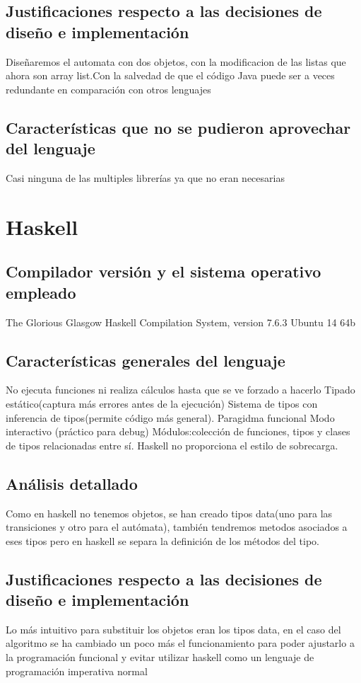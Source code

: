 \documentclass[12pt,a4paper]{article}
\begin{document}
    \subsection{Justificaciones respecto a las decisiones de diseño e implementación}
    Diseñaremos el automata con dos objetos, con la modificacion de las listas que ahora son array list.Con la salvedad de que el código Java puede ser a veces redundante en comparación con otros lenguajes
    \subsection{Características que no se pudieron aprovechar del lenguaje}
    Casi ninguna de las multiples librerías ya que no eran necesarias
     \section{Haskell}
       \subsection{Compilador versión y el sistema operativo empleado}
       The Glorious Glasgow Haskell Compilation System, version 7.6.3
       Ubuntu 14 64b
       \subsection{Características generales del lenguaje}
       	No ejecuta funciones ni realiza cálculos hasta que se ve forzado a hacerlo
        Tipado estático(captura más errores antes de la ejecución)
        Sistema de tipos con inferencia de tipos(permite código más general).
        Paragidma funcional
        Modo interactivo (práctico para debug)
        Módulos:colección de funciones, tipos y clases de tipos relacionadas entre sí.
        Haskell no proporciona el estilo de sobrecarga.
       \subsection{Análisis detallado}
        Como en haskell no tenemos objetos, se han creado tipos data(uno para las transiciones y otro para el autómata), también tendremos metodos asociados a eses tipos pero en haskell se separa la definición de los métodos del tipo.
        
       \subsection{Justificaciones respecto a las decisiones de diseño e implementación}
       Lo más intuitivo para substituir los objetos eran los tipos data, en el caso del algoritmo se ha cambiado un poco más el funcionamiento para poder ajustarlo a la programación funcional y evitar utilizar haskell como un lenguaje de programación imperativa normal
\end{document}
